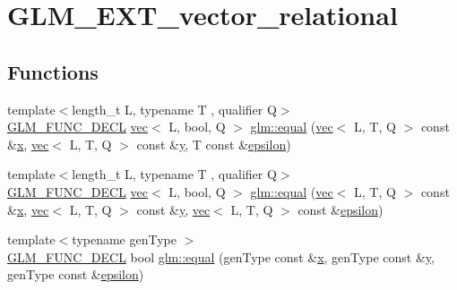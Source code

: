 \hypertarget{group__ext__vector__relational}{}\section{G\+L\+M\+\_\+\+E\+X\+T\+\_\+vector\+\_\+relational}
\label{group__ext__vector__relational}
\subsection*{Functions}
\begin{DoxyCompactItemize}
\item 
{\footnotesize template$<$length\+\_\+t L, typename T , qualifier Q$>$ }\\\mbox{\hyperlink{setup_8hpp_ab2d052de21a70539923e9bcbf6e83a51}{G\+L\+M\+\_\+\+F\+U\+N\+C\+\_\+\+D\+E\+CL}} \mbox{\hyperlink{structglm_1_1vec}{vec}}$<$ L, bool, Q $>$ \mbox{\hyperlink{group__ext__vector__relational_gae630b1f87fbd3b762ca46b0b8b32b02e}{glm\+::equal}} (\mbox{\hyperlink{structglm_1_1vec}{vec}}$<$ L, T, Q $>$ const \&\mbox{\hyperlink{_s_d_l__opengl_8h_ad0e63d0edcdbd3d79554076bf309fd47}{x}}, \mbox{\hyperlink{structglm_1_1vec}{vec}}$<$ L, T, Q $>$ const \&\mbox{\hyperlink{_s_d_l__opengl_8h_a1675d9d7bb68e1657ff028643b4037e3}{y}}, T const \&\mbox{\hyperlink{group__gtc__constants_ga2a1e57fc5592b69cfae84174cbfc9429}{epsilon}})
\item 
{\footnotesize template$<$length\+\_\+t L, typename T , qualifier Q$>$ }\\\mbox{\hyperlink{setup_8hpp_ab2d052de21a70539923e9bcbf6e83a51}{G\+L\+M\+\_\+\+F\+U\+N\+C\+\_\+\+D\+E\+CL}} \mbox{\hyperlink{structglm_1_1vec}{vec}}$<$ L, bool, Q $>$ \mbox{\hyperlink{group__ext__vector__relational_ga6fb2432528edd028e3c2cf5b78d99797}{glm\+::equal}} (\mbox{\hyperlink{structglm_1_1vec}{vec}}$<$ L, T, Q $>$ const \&\mbox{\hyperlink{_s_d_l__opengl_8h_ad0e63d0edcdbd3d79554076bf309fd47}{x}}, \mbox{\hyperlink{structglm_1_1vec}{vec}}$<$ L, T, Q $>$ const \&\mbox{\hyperlink{_s_d_l__opengl_8h_a1675d9d7bb68e1657ff028643b4037e3}{y}}, \mbox{\hyperlink{structglm_1_1vec}{vec}}$<$ L, T, Q $>$ const \&\mbox{\hyperlink{group__gtc__constants_ga2a1e57fc5592b69cfae84174cbfc9429}{epsilon}})
\item 
{\footnotesize template$<$typename gen\+Type $>$ }\\\mbox{\hyperlink{setup_8hpp_ab2d052de21a70539923e9bcbf6e83a51}{G\+L\+M\+\_\+\+F\+U\+N\+C\+\_\+\+D\+E\+CL}} bool \mbox{\hyperlink{group__ext__vector__relational_gac4ae021e79693174e4de6560d159b33a}{glm\+::equal}} (gen\+Type const \&\mbox{\hyperlink{_s_d_l__opengl_8h_ad0e63d0edcdbd3d79554076bf309fd47}{x}}, gen\+Type const \&\mbox{\hyperlink{_s_d_l__opengl_8h_a1675d9d7bb68e1657ff028643b4037e3}{y}}, gen\+Type const \&\mbox{\hyperlink{group__gtc__constants_ga2a1e57fc5592b69cfae84174cbfc9429}{epsilon}})

\end{DoxyCompactItemize}
